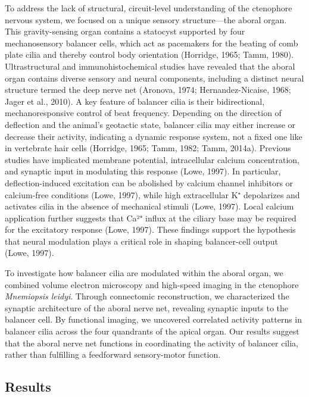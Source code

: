 \documentclass[
  11pt,
]{article}
\begin{document}
To address the lack of structural, circuit-level understanding of the
ctenophore nervous system, we focused on a unique sensory
structure---the aboral organ. This gravity-sensing organ contains a
statocyst supported by four mechanosensory balancer cells, which act as
pacemakers for the beating of comb plate cilia and thereby control body
orientation (Horridge, 1965; Tamm, 1980). Ultrastructural and
immunohistochemical studies have revealed that the aboral organ contains
diverse sensory and neural components, including a distinct neural
structure termed the deep nerve net (Aronova, 1974; Hernandez-Nicaise,
1968; Jager et al., 2010). A key feature of balancer cilia is their
bidirectional, mechanoresponsive control of beat frequency. Depending on
the direction of deflection and the animal's geotactic state, balancer
cilia may either increase or decrease their activity, indicating a
dynamic response system, not a fixed one like in vertebrate hair cells
(Horridge, 1965; Tamm, 1982; Tamm, 2014a). Previous studies have
implicated membrane potential, intracellular calcium concentration, and
synaptic input in modulating this response (Lowe, 1997). In particular,
deflection-induced excitation can be abolished by calcium channel
inhibitors or calcium-free conditions (Lowe, 1997), while high
extracellular K⁺ depolarizes and activates cilia in the absence of
mechanical stimuli (Lowe, 1997). Local calcium application further
suggests that Ca²⁺ influx at the ciliary base may be required for the
excitatory response (Lowe, 1997). These findings support the hypothesis
that neural modulation plays a critical role in shaping balancer-cell
output (Lowe, 1997).

To investigate how balancer cilia are modulated within the aboral organ,
we combined volume electron microscopy and high-speed imaging in the
ctenophore \emph{Mnemiopsis leidyi}. Through connectomic reconstruction,
we characterized the synaptic architecture of the aboral nerve net,
revealing synaptic inputs to the balancer cell. By functional imaging,
we uncovered correlated activity patterns in balancer cilia across the
four quandrants of the apical organ. Our results suggest that the aboral
nerve net functions in coordinating the activity of balancer cilia,
rather than fulfilling a feedforward sensory-motor function.

\subsection{Results}\label{results}
\end{document}
